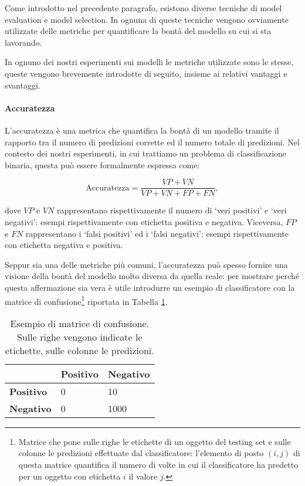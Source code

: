 \documentclass[../../main.tex]{subfiles}
\begin{document}
    Come introdotto nel precedente paragrafo, esistono diverse tecniche di model evaluation e model selection. In ognuna di queste tecniche vengono ovviamente utilizzate delle metriche per quantificare la bontà del modello su cui si sta lavorando.

    In ognuno dei nostri esperimenti sui modelli le metriche utilizzate sono le stesse, queste vengono brevemente introdotte di seguito, insieme ai relativi vantaggi e svantaggi.

    \paragraph{Accuratezza}
    L'accuratezza è una metrica che quantifica la bontà di un modello tramite il rapporto tra il numero di predizioni corrette ed il numero totale di predizioni. Nel contesto dei nostri esperimenti, in cui trattiamo un problema di classificazione binaria, questa può essere formalmente espressa come: 

    \begin{equation}
        \mathrm{Accuratezza} = \frac{VP + VN}{VP + VN + FP + FN},
    \end{equation}

    dove $VP$ e $VN$ rappresentano rispettivamente il numero di `veri positivi' e `veri negativi': esempi rispettivamente con etichetta positiva e negativa. Viceversa, $FP$ e $FN$ rappresentano i `falsi positivi' ed i `falsi negativi': esempi rispettivamente con etichetta negativa e positiva.

    Seppur sia una delle metriche più comuni, l'accuratezza può spesso fornire una visione della bontà del modello molto diversa da quella reale: per mostrare perché questa affermazione sia vera è utile introdurre un esempio di classificatore con la matrice di confusione\footnote{Matrice che pone sulle righe le etichette di un oggetto del testing set e sulle colonne le predizioni effettuate dal classificatore: l'elemento di posto $(i, j)$ di questa matrice quantifica il numero di volte in cui il classificatore ha predetto per un oggetto con etichetta $i$ il valore $j$.} riportata in Tabella \ref{tab:matriceConfusione}.

    \begin{table}[H]
        \centering
        \begin{tabular}{l|ll}
                            & \textbf{Positivo} & \textbf{Negativo} \\ \hline
        \textbf{Positivo} & 0                 & 10                 \\
        \textbf{Negativo} & 0                 & 1000             
        \end{tabular}
        \caption{Esempio di matrice di confusione. Sulle righe vengono indicate le etichette, sulle colonne le predizioni.}  
        \label{tab:matriceConfusione}    
    \end{table}
\end{document}
